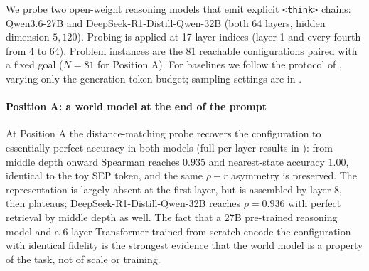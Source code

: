 \documentclass{article} %
\begin{document}
We probe two open-weight reasoning models that emit explicit \texttt{<think>} chains: \mbox{Qwen3.6-27B} and \mbox{DeepSeek-R1-Distill-Qwen-32B} (both 64 layers, hidden dimension $5{,}120$). Probing is applied at 17 layer indices (layer 1 and every fourth from 4 to 64). Problem instances are the 81 reachable configurations paired with a fixed goal ($N=81$ for Position A). For baselines we follow the protocol of \citet{shojaee2025illusion}, varying only the generation token budget; sampling settings are in .




\paragraph{Position A: a world model at the end of the prompt}
\label{sec:lrm-posA}

At Position A the distance-matching probe recovers the configuration to essentially perfect accuracy in both models (full per-layer results in ): from middle depth onward Spearman reaches $0.935$ and nearest-state accuracy $1.00$, identical to the toy SEP token, and the same $\rho{-}r$ asymmetry is preserved. The representation is largely absent at the first layer, but is assembled by layer 8, then plateaus; DeepSeek-R1-Distill-Qwen-32B reaches $\rho=0.936$ with perfect retrieval by middle depth as well. The fact that a 27B pre-trained reasoning model and a 6-layer Transformer trained from scratch encode the configuration with identical fidelity is the strongest evidence that the world model is a property of the task, not of scale or training. %
\end{document}
